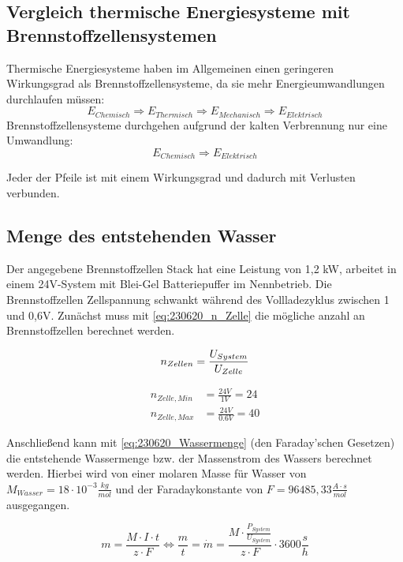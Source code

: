 \subsection{Vergleich thermische Energiesysteme mit Brennstoffzellensystemen}

Thermische Energiesysteme haben im Allgemeinen einen geringeren Wirkungsgrad als Brennstoffzellensysteme, da sie  mehr Energieumwandlungen durchlaufen müssen:
$$E_{Chemisch} \Rightarrow E_{Thermisch} \Rightarrow E_{Mechanisch} \Rightarrow E_{Elektrisch}$$ 
Brennstoffzellensysteme durchgehen aufgrund der kalten Verbrennung nur eine Umwandlung:
$$E_{Chemisch} \Rightarrow E_{Elektrisch}$$

Jeder der Pfeile ist mit einem Wirkungsgrad und dadurch mit Verlusten verbunden.

\subsection{Menge des entstehenden Wasser}
\label{sec:VF_H2O_Menge}

Der angegebene Brennstoffzellen Stack hat eine Leistung von 1,2 kW, arbeitet in einem 24V-System mit Blei-Gel Batteriepuffer im Nennbetrieb.
Die Brennstoffzellen Zellspannung schwankt während des Vollladezyklus zwischen 1 und 0,6V.
Zunächst muss mit \autoref{eq:230620_n_Zelle} die mögliche anzahl an Brennstoffzellen berechnet werden.

\begin{equation}
    n_{Zellen} = \frac{U_{System}}{U_{Zelle}}\\
    \label{eq:230620_n_Zelle}
\end{equation}

\begin{align}
    n_{Zelle,Min} &= \frac{24V}{1V} = 24 \nonumber\\
    n_{Zelle,Max} &= \frac{24V}{0.6V} = 40 \nonumber
\end{align}

Anschließend kann mit \autoref{eq:230620_Wassermenge} (den Faraday'schen Gesetzen) die entstehende Wassermenge bzw. der Massenstrom des Wassers berechnet werden.
Hierbei wird von einer molaren Masse für Wasser von $M_{Wasser} = 18 \cdot 10^{-3} \frac{kg}{mol}$ und der Faradaykonstante von $F =96485,33 \frac{A\cdot s}{mol}$ ausgegangen.

\begin{equation}
    m = \frac{M \cdot I \cdot t}{z \cdot F} \Leftrightarrow \frac{m}{t} = \dot{m} = \frac{M \cdot \frac{P_{System}}{U_{System}}}{z \cdot F} \cdot 3600 \frac{s}{h}
    \label{eq:230620_Wassermenge}
\end{equation}

